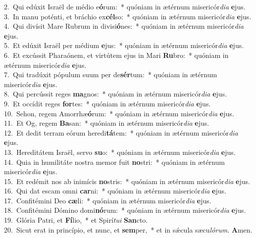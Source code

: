 {2.~}Qui edúxit Israël de médio e\textbf{ó}rum:~* quóniam in ætérnum misericór\textit{di}\textit{a} \textbf{e}jus.\\
{3.~}In manu poténti, et bráchio ex\textbf{cél}so:~* quóniam in ætérnum misericór\textit{di}\textit{a} \textbf{e}jus.\\
{4.~}Qui divísit Mare Rubrum in divisi\textbf{ó}nes:~* quóniam in ætérnum misericór\textit{di}\textit{a} \textbf{e}jus.\\
{5.~}Et edúxit Israël per médium \textbf{e}jus:~* quóniam in ætérnum misericór\textit{di}\textit{a} \textbf{e}jus.\\
{6.~}Et excússit Pharaónem, et virtútem ejus in Mari \textbf{Ru}bro:~* quóniam in ætérnum misericór\textit{di}\textit{a} \textbf{e}jus.\\
{7.~}Qui tradúxit pópulum suum per de\textbf{sér}tum:~* quóniam in ætérnum misericór\textit{di}\textit{a} \textbf{e}jus.\\
{8.~}Qui percússit reges \textbf{ma}gnos:~* quóniam in ætérnum misericór\textit{di}\textit{a} \textbf{e}jus.\\
{9.~}Et occídit reges \textbf{for}tes:~* quóniam in ætérnum misericór\textit{di}\textit{a} \textbf{e}jus.\\
{10.~}Sehon, regem Amorrhæ\textbf{ó}rum:~* quóniam in ætérnum misericór\textit{di}\textit{a} \textbf{e}jus.\\
{11.~}Et Og, regem \textbf{Ba}san:~* quóniam in ætérnum misericór\textit{di}\textit{a} \textbf{e}jus.\\
{12.~}Et dedit terram eórum heredi\textbf{tá}tem:~* quóniam in ætérnum misericór\textit{di}\textit{a} \textbf{e}jus.\\
{13.~}Hereditátem Israël, servo \textbf{su}o:~* quóniam in ætérnum misericór\textit{di}\textit{a} \textbf{e}jus.\\
{14.~}Quia in humilitáte nostra memor fuit \textbf{no}stri:~* quóniam in ætérnum misericór\textit{di}\textit{a} \textbf{e}jus.\\
{15.~}Et redémit nos ab inimícis \textbf{no}stris:~* quóniam in ætérnum misericór\textit{di}\textit{a} \textbf{e}jus.\\
{16.~}Qui dat escam omni \textbf{car}ni:~* quóniam in ætérnum misericór\textit{di}\textit{a} \textbf{e}jus.\\
{17.~}Confitémini Deo \textbf{cæ}li:~* quóniam in ætérnum misericór\textit{di}\textit{a} \textbf{e}jus.\\
{18.~}Confitémini Dómino domi\textbf{nó}rum:~* quóniam in ætérnum misericór\textit{di}\textit{a} \textbf{e}jus.\\
{19.~}Glória Patri, et \textbf{Fí}lio,~* et Spirí\textit{tu}\textit{i} \textbf{San}cto.\\
{20.~}Sicut erat in princípio, et nunc, et \textbf{sem}per,~* et in sǽcula sæcu\textit{ló}\textit{rum}. \textbf{A}men.\\
